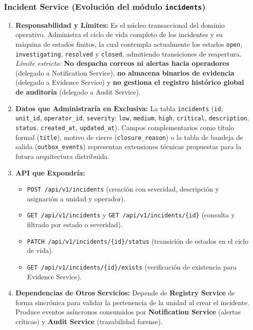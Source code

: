 \documentclass[10pt,a4paper]{article}
\begin{document}
\subsubsection{Incident Service (Evolución del módulo \texttt{incidents})}

\begin{enumerate}[leftmargin=*]
    \item \textbf{Responsabilidad y Límites:} Es el núcleo transaccional del dominio operativo. Administra el ciclo de vida completo de los incidentes y su máquina de estados finitos, la cual contempla actualmente los estados \texttt{open}, \texttt{investigating}, \texttt{resolved} y \texttt{closed}, admitiendo transiciones de reapertura. \textit{Límite estricto:} \textbf{No despacha correos ni alertas hacia operadores} (delegado a Notification Service), \textbf{no almacena binarios de evidencia} (delegado a Evidence Service) y \textbf{no gestiona el registro histórico global de auditoría} (delegado a Audit Service).
    \item \textbf{Datos que Administraría en Exclusiva:} La tabla \texttt{incidents} (\texttt{id}, \texttt{unit\_id}, \texttt{operator\_id}, \texttt{severity}: \texttt{low}, \texttt{medium}, \texttt{high}, \texttt{critical}, \texttt{description}, \texttt{status}, \texttt{created\_at}, \texttt{updated\_at}). Campos complementarios como título formal (\texttt{title}), motivo de cierre (\texttt{closure\_reason}) o la tabla de bandeja de salida (\texttt{outbox\_events}) representan extensiones técnicas propuestas para la futura arquitectura distribuida.
    \item \textbf{API que Expondría:}
    \begin{itemize}[leftmargin=*]
        \item \texttt{POST /api/v1/incidents} (creación con severidad, descripción y asignación a unidad y operador).
        \item \texttt{GET /api/v1/incidents} y \texttt{GET /api/v1/incidents/\{id\}} (consulta y filtrado por estado o severidad).
        \item \texttt{PATCH /api/v1/incidents/\{id\}/status} (transición de estados en el ciclo de vida).
        \item \texttt{GET /api/v1/incidents/\{id\}/exists} (verificación de existencia para Evidence Service).
    \end{itemize}
    \item \textbf{Dependencias de Otros Servicios:} Depende de \textbf{Registry Service} de forma sincrónica para validar la pertenencia de la unidad al crear el incidente. Produce eventos asíncronos consumidos por \textbf{Notification Service} (alertas críticas) y \textbf{Audit Service} (trazabilidad forense).

\end{enumerate}
\end{document}
